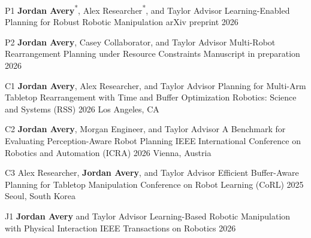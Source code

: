 



\VectraPublicationEntry
    {P1}
    {\textbf{Jordan Avery}\textsuperscript{*}, Alex Researcher\textsuperscript{*}, and Taylor Advisor}
    {Learning-Enabled Planning for Robust Robotic Manipulation}
    {arXiv preprint}
    {2026}
    {}
    {
    }

\VectraPublicationEntry
    {P2}
    {\textbf{Jordan Avery}, Casey Collaborator, and Taylor Advisor}
    {Multi-Robot Rearrangement Planning under Resource Constraints}
    {Manuscript in preparation}
    {2026}
    {}
    {}


\VectraPublicationEntry
    {C1}
    {\textbf{Jordan Avery}, Alex Researcher, and Taylor Advisor}
    {Planning for Multi-Arm Tabletop Rearrangement with Time and Buffer Optimization}
    {Robotics: Science and Systems (RSS)}
    {2026}
    {Los Angeles, CA}
    {
    }

\VectraPublicationEntry
    {C2}
    {\textbf{Jordan Avery}, Morgan Engineer, and Taylor Advisor}
    {A Benchmark for Evaluating Perception-Aware Robot Planning}
    {IEEE International Conference on Robotics and Automation (ICRA)}
    {2026}
    {Vienna, Austria}
    {
    }

\VectraPublicationEntry
    {C3}
    {Alex Researcher, \textbf{Jordan Avery}, and Taylor Advisor}
    {Efficient Buffer-Aware Planning for Tabletop Manipulation}
    {Conference on Robot Learning (CoRL)}
    {2025}
    {Seoul, South Korea}
    {
    }


\VectraPublicationEntry
    {J1}
    {\textbf{Jordan Avery} and Taylor Advisor}
    {Learning-Based Robotic Manipulation with Physical Interaction}
    {IEEE Transactions on Robotics}
    {2026}
    {}
    {
    }